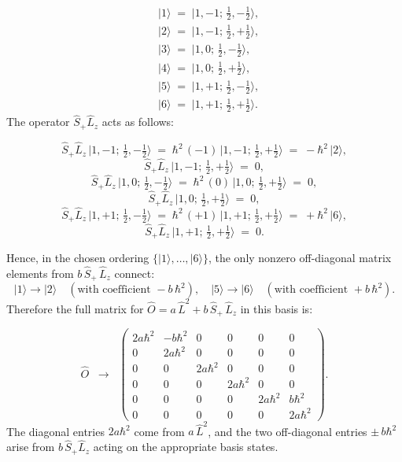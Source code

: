 \documentclass{article}
\begin{document}
\[
\begin{aligned}
&\lvert 1\rangle \;=\; \lvert 1, -1;\,\tfrac12,-\tfrac12\rangle,\\
&\lvert 2\rangle \;=\; \lvert 1, -1;\,\tfrac12,+\tfrac12\rangle,\\
&\lvert 3\rangle \;=\; \lvert 1, 0;\,\tfrac12,-\tfrac12\rangle,\\
&\lvert 4\rangle \;=\; \lvert 1, 0;\,\tfrac12,+\tfrac12\rangle,\\
&\lvert 5\rangle \;=\; \lvert 1, +1;\,\tfrac12,-\tfrac12\rangle,\\
&\lvert 6\rangle \;=\; \lvert 1, +1;\,\tfrac12,+\tfrac12\rangle.
\end{aligned}
\]
The operator \(\hat{S}_+\hat{L}_z\) acts as follows:

\[
\hat{S}_+\hat{L}_z\,\lvert 1, -1;\,\tfrac12,-\tfrac12\rangle
\;=\;
\hbar^2\,(-1)\,\lvert 1, -1;\,\tfrac12,+\tfrac12\rangle
\;=\;
-\hbar^2\,\lvert 2\rangle,
\]
\[
\hat{S}_+\hat{L}_z\,\lvert 1, -1;\,\tfrac12,+\tfrac12\rangle 
\;=\;
0,
\]
\[
\hat{S}_+\hat{L}_z\,\lvert 1, 0;\,\tfrac12,-\tfrac12\rangle
\;=\;
\hbar^2\,(0)\,\lvert 1, 0;\,\tfrac12,+\tfrac12\rangle
\;=\;
0,
\]
\[
\hat{S}_+\hat{L}_z\,\lvert 1, 0;\,\tfrac12,+\tfrac12\rangle 
\;=\;
0,
\]
\[
\hat{S}_+\hat{L}_z\,\lvert 1, +1;\,\tfrac12,-\tfrac12\rangle
\;=\;
\hbar^2\,(+1)\,\lvert 1, +1;\,\tfrac12,+\tfrac12\rangle
\;=\;
+\hbar^2\,\lvert 6\rangle,
\]
\[
\hat{S}_+\hat{L}_z\,\lvert 1, +1;\,\tfrac12,+\tfrac12\rangle 
\;=\;
0.
\]

Hence, in the chosen ordering \(\{\lvert 1\rangle,\dots,\lvert 6\rangle\}\), the only nonzero off-diagonal matrix elements from \(b\,\hat{S}_+\,\hat{L}_z\) connect:
\[
\lvert 1\rangle \to \lvert 2\rangle 
\quad (\text{with coefficient }-b\,\hbar^2),
\quad
\lvert 5\rangle \to \lvert 6\rangle
\quad (\text{with coefficient }+b\,\hbar^2).
\]
Therefore the full matrix for \(\hat{O} = a\,\hat{L}^2 + b\,\hat{S}_+\,\hat{L}_z\) in this basis is:

\[
\hat{O}\;\;\longrightarrow\;\;
\begin{pmatrix}
2a\hbar^2 & -b\hbar^2 & 0 & 0 & 0 & 0 \\[6pt]
0 & 2a\hbar^2 & 0 & 0 & 0 & 0 \\[6pt]
0 & 0 & 2a\hbar^2 & 0 & 0 & 0 \\[6pt]
0 & 0 & 0 & 2a\hbar^2 & 0 & 0 \\[6pt]
0 & 0 & 0 & 0 & 2a\hbar^2 & b\hbar^2 \\[6pt]
0 & 0 & 0 & 0 & 0 & 2a\hbar^2
\end{pmatrix}.
\]
The diagonal entries \(2a\hbar^2\) come from \(a\,\hat{L}^2\), and the two off-diagonal entries \(\pm\,b\hbar^2\) arise from \(b\,\hat{S}_+\hat{L}_z\) acting on the appropriate basis states.
\end{document}
